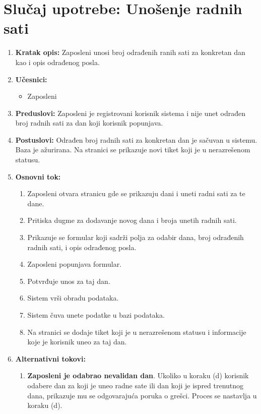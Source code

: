 \documentclass[a4paper]{article}
\begin{document}
\section{Slučaj upotrebe: Unošenje radnih sati}
\begin{enumerate}
    \item \textbf{Kratak opis:} Zaposleni unosi broj odrađenih ranih sati za konkretan dan kao i opis odrađenog posla.
    \item \textbf{Učesnici:}
        \begin{itemize}
            \item Zaposleni
        \end{itemize}
    \item \textbf{Preduslovi:} Zaposleni je registrovani korisnik sistema i nije unet odrađen broj radnih sati za dan koji korisnik popunjava.
    \item \textbf{Postuslovi:} Odrađen broj radnih sati za konkretan dan je sačuvan u sistemu. Baza je ažurirana. Na stranici se prikazuje novi tiket koji je u nerazrešenom statusu.
    \item \textbf{Osnovni tok:}
        \begin{enumerate}
            \item Zaposleni otvara stranicu gde se prikazuju dani i uneti radni sati za te dane.
            \item Pritiska dugme za dodavanje novog dana i broja unetih radnih sati.
            \item Prikazuje se formular koji sadrži polja za odabir dana, broj odrađenih radnih sati, i opis odrađenog posla.
            \item Zaposleni popunjava formular.
            \item Potvrđuje unos za taj dan.
            \item Sistem vrši obradu podataka.
            \item Sistem čuva unete podatke u bazi podataka.
            \item Na stranici se dodaje tiket koji je u nerazrešenom statusu i informacije koje je korisnik uneo za taj dan.
        \end{enumerate}
    \item \textbf{Alternativni tokovi:}
        \begin{enumerate}
            \item \textbf{Zaposleni je odabrao nevalidan dan}. Ukoliko u koraku (d) korisnik odabere dan za koji je uneo radne sate ili dan koji je ispred trenutnog dana, prikazuje mu se odgovarajuća poruka o grešci. Proces se nastavlja u koraku (d).

\end{enumerate}
\end{enumerate}
\end{document}

